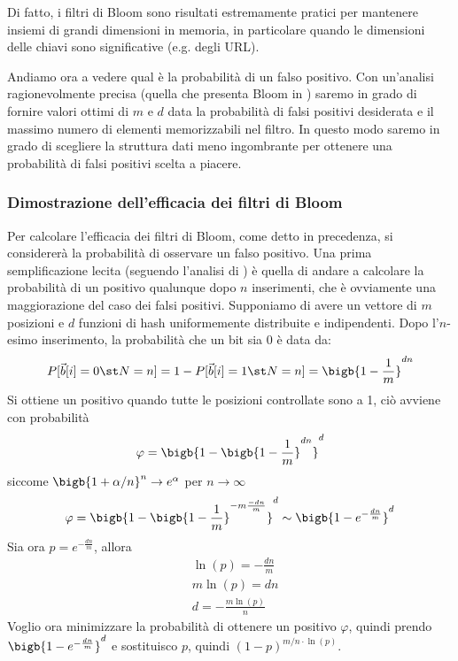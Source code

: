 Di fatto, i filtri di Bloom sono risultati estremamente pratici per mantenere insiemi di grandi dimensioni in memoria, in particolare quando le dimensioni delle chiavi sono significative (e.g. degli URL).

Andiamo ora a vedere qual è la probabilità di un falso positivo. Con un'analisi ragionevolmente precisa (quella che presenta Bloom in \cite{Bloom}) saremo in grado di fornire valori ottimi di $m$ e $d$ data la probabilità di falsi positivi desiderata e il massimo numero di elementi memorizzabili nel filtro. In questo modo saremo in grado di scegliere la struttura dati meno ingombrante per ottenere una probabilità di falsi positivi scelta a piacere.

\subsubsection{Dimostrazione dell'efficacia dei filtri di Bloom}
Per calcolare l'efficacia dei filtri di Bloom, come detto in precedenza, si considererà la probabilità di osservare un falso positivo. Una prima semplificazione lecita (seguendo l'analisi di \cite{Bloom}) è quella di andare a calcolare la probabilità di un positivo qualunque dopo $n$ inserimenti, che è ovviamente una maggiorazione del caso dei falsi positivi.
Supponiamo di avere un vettore di $m$ posizioni e $d$ funzioni di hash uniformemente distribuite e indipendenti. Dopo l'$n$-esimo inserimento, la probabilità che un bit sia 0 è data da:
\begin{equation*}
    P[\vec{b}[i] = 0 \st N = n] = 1 - P[\vec{b}[i] = 1 \st N = n] = \bigb{1 - \frac{1}{m}}^{dn}
\end{equation*}
Si ottiene un positivo quando tutte le posizioni controllate sono a 1, ciò avviene con probabilità
\begin{equation*}
    \varphi = \bigb{1 - \bigb{1 - \frac{1}{m}}^{dn}}^d
\end{equation*}
siccome $\bigb{1 + \alpha/n}^n \rightarrow e^{\alpha}$ per $n \rightarrow \infty$
\begin{equation*}
    \varphi = \bigb{1 - \bigb{1 - \frac{1}{m}}^{-m \frac{-dn}{m}}}^d \sim \bigb{1 - e^{-\frac{dn}{m}}}^d
\end{equation*}
Sia ora $p = e^{-\frac{dn}{m}}$, allora
\begin{align*}
    &\ln(p) = -\frac{dn}{m}\\
    &m\ln(p) = dn\\
    &d = -\frac{m\ln(p)}{n}
\end{align*}
Voglio ora minimizzare la probabilità di ottenere un positivo $\varphi$, quindi prendo $\bigb{1 - e^{-\frac{dn}{m}}}^d$ e sostituisco $p$, quindi $(1 - p)^{m/n \cdot \ln(p)}$.\\
